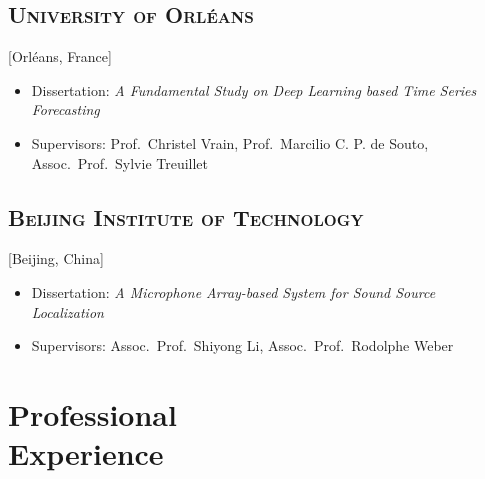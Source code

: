 \documentclass{mycv}
\begin{document}
\subsection{\large \scshape University of Orl\'eans}[Orl\'eans, France]

\begin{positions}
\end{positions}


\begin{itemize}
  \itemsep 0em
  \item Dissertation: \textit{A Fundamental Study on Deep Learning based Time Series Forecasting}
  \item Supervisors: Prof.~Christel Vrain, Prof.~Marcilio C. P. de Souto, Assoc.~Prof.~Sylvie Treuillet
\end{itemize}


\subsection{\large \scshape Beijing Institute of Technology}[Beijing, China]

\begin{positions}
\end{positions}


\begin{itemize}
  \itemsep 0em
  \item Dissertation: \textit{A Microphone Array-based System for Sound Source Localization}
  \item Supervisors: Assoc.~Prof.~Shiyong Li, Assoc.~Prof.~Rodolphe Weber
\end{itemize}

\vspace{-0.5em}

\section{Professional \\ Experience}
\end{document}
